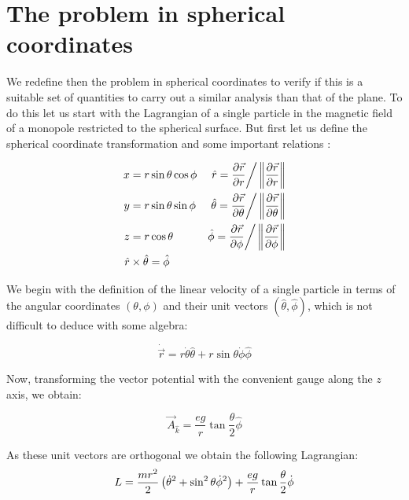 \section{The problem in spherical coordinates}
We redefine then the problem in spherical coordinates to verify if this is a suitable set of quantities to carry out a similar analysis than that of the plane. To do this let us start with the Lagrangian of a single particle in the magnetic field of a monopole restricted to the spherical surface. But first let us define the spherical coordinate transformation and some important relations \cite{sphericalcoordinates}:

\begin{align*}
x &= r\sin{\theta}\cos{\phi} & \hat{r} = \frac{\partial \vec{r}}{\partial r}\bigg/\left\lVert \frac{\partial \vec{r}}{\partial r} \right\rVert\\
y &= r\sin{\theta}\sin{\phi} & \hat{\theta} = \frac{\partial \vec{r}}{\partial \theta}\bigg/\left\lVert \frac{\partial \vec{r}}{\partial \theta} \right\rVert \\
z &= r\cos{\theta} & \hat{\phi} = \frac{\partial \vec{r}}{\partial \phi}\bigg/\left\lVert \frac{\partial \vec{r}}{\partial \phi} \right\rVert\\
\hat{r}&\times \hat{\theta} = \hat{\phi}
\end{align*}

We begin with the definition of the  linear velocity of a single particle in terms of the angular coordinates $(\theta,\phi)$ and their unit vectors $(\hat{\theta},\hat{\phi})$, which is not difficult to deduce with some algebra:

\begin{equation}
\dot{\vec{r}} = r\dot{\theta}\hat{\theta} + r\sin{\theta}\dot{\phi}\hat{\phi}
\end{equation}

Now, transforming the vector potential with the convenient gauge along the $z$ axis, we obtain:

\begin{equation*}
\vec{A}_{\hat{k}} = \frac{eg}{r}\tan{\frac{\theta}{2}}\hat{\phi}
\end{equation*}

As these unit vectors are orthogonal we obtain the following Lagrangian:\\

\begin{equation*}
L = \frac{mr^2}{2}\left( \dot{\theta}^2 + \sin^2\theta \dot{\phi}^2 \right) + \frac{eg}{r}\tan{\frac{\theta}{2}\dot{\phi}}
\end{equation*}

